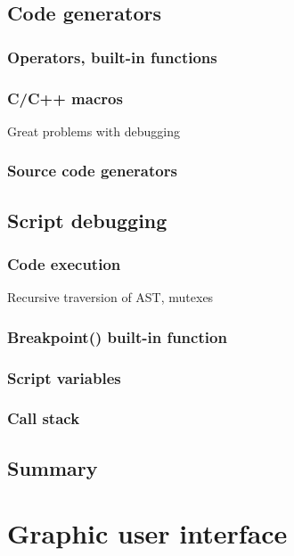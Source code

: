 \documentclass[11pt,twoside,a4paper]{book}
\begin{document}
\subsection{Code generators}

\subsubsection{Operators, built-in functions}

\subsubsection{C/C++ macros}
Great problems with debugging

\subsubsection{Source code generators}


\subsection{Script debugging}

\subsubsection{Code execution}

Recursive traversion of AST, mutexes


\subsubsection{Breakpoint() built-in function}

\subsubsection{Script variables}

\subsubsection{Call stack}


\subsection{Summary}



\section{Graphic user interface}
\end{document}
